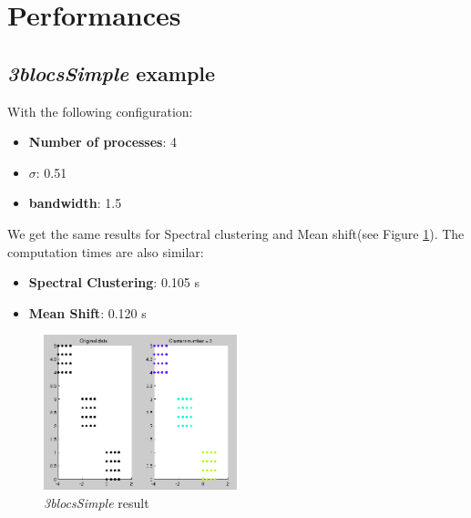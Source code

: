 \section{Performances}
\subsection{\textit{3blocsSimple} example}
With the following configuration:
\begin{itemize}
\item \textbf{Number of processes}: 4
\item \textbf{$\sigma$}: 0.51
\item \textbf{bandwidth}: 1.5
\end{itemize}
We get the same results for Spectral clustering and Mean shift(see Figure \ref{3blocsSimple}). The computation times are also similar:
\begin{itemize}
\item \textbf{Spectral Clustering}: 0.105 s
\item \textbf{Mean Shift}: 0.120 s
\end{itemize}
\begin{figure}[h!]
\includegraphics[width=0.5\textwidth]{Image/3blocsSimple.png}\centering
\caption{\textit{3blocsSimple} result\label{3blocsSimple}}
\end{figure}

